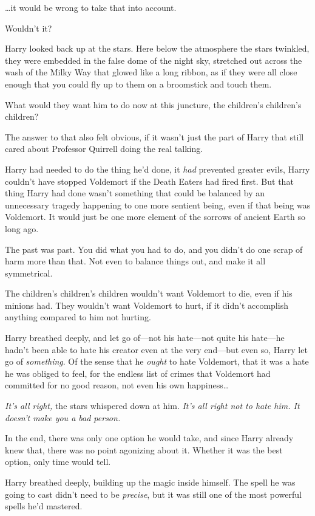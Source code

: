 …it would be wrong to take that into account.

Wouldn't it?

Harry looked back up at the stars. Here below the atmosphere the stars twinkled, they were embedded in the false dome of the night sky, stretched out across the wash of the Milky Way that glowed like a long ribbon, as if they were all close enough that you could fly up to them on a broomstick and touch them.

What would they want him to do now at this juncture, the children's children's children?

The answer to that also felt obvious, if it wasn't just the part of Harry that still cared about Professor Quirrell doing the real talking.

Harry had needed to do the thing he'd done, it \emph{had} prevented greater evils, Harry couldn't have stopped Voldemort if the Death Eaters had fired first. But that thing Harry had done wasn't something that could be balanced by an unnecessary tragedy happening to one more sentient being, even if that being was Voldemort. It would just be one more element of the sorrows of ancient Earth so long ago.

The past was past. You did what you had to do, and you didn't do one scrap of harm more than that. Not even to balance things out, and make it all symmetrical.

The children's children's children wouldn't want Voldemort to die, even if his minions had. They wouldn't want Voldemort to hurt, if it didn't accomplish anything compared to him not hurting.

Harry breathed deeply, and let go of—not his hate—not quite his hate—he hadn't been able to hate his creator even at the very end—but even so, Harry let go of \emph{something}. Of the sense that he \emph{ought} to hate Voldemort, that it was a hate he was obliged to feel, for the endless list of crimes that Voldemort had committed for no good reason, not even his own happiness…

\emph{It's all right,} the stars whispered down at him. \emph{It's all right not to hate him. It doesn't make you a bad person.}

In the end, there was only one option he would take, and since Harry already knew that, there was no point agonizing about it. Whether it was the best option, only time would tell.

Harry breathed deeply, building up the magic inside himself. The spell he was going to cast didn't need to be \emph{precise}, but it was still one of the most powerful spells he'd mastered.

